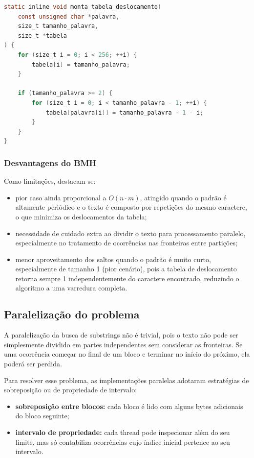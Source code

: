 \documentclass[10pt,twocolumn,a4paper]{article}
\begin{document}
\begin{lstlisting}[language=C, caption={Construção da tabela de deslocamentos do BMH em C}]
static inline void monta_tabela_deslocamento(
    const unsigned char *palavra,
    size_t tamanho_palavra,
    size_t *tabela
) {
    for (size_t i = 0; i < 256; ++i) {
        tabela[i] = tamanho_palavra;
    }

    if (tamanho_palavra >= 2) {
        for (size_t i = 0; i < tamanho_palavra - 1; ++i) {
            tabela[palavra[i]] = tamanho_palavra - 1 - i;
        }
    }
}
\end{lstlisting}

\subsubsection{Desvantagens do BMH}

Como limitações, destacam-se:

\begin{itemize}[leftmargin=*]
    \item pior caso ainda proporcional a $O(n \cdot m)$, atingido quando o padrão é altamente periódico e o texto é composto por repetições do mesmo caractere, o que minimiza os deslocamentos da tabela;
    \item necessidade de cuidado extra ao dividir o texto para processamento paralelo, especialmente no tratamento de ocorrências nas fronteiras entre partições;
    \item menor aproveitamento dos saltos quando o padrão é muito curto, especialmente de tamanho 1 (pior cenário), pois a tabela de deslocamento retorna sempre 1 independentemente do caractere encontrado, reduzindo o algoritmo a uma varredura completa.
\end{itemize}


\subsection{Paralelização do problema}

A paralelização da busca de substrings não é trivial, pois o texto não pode ser simplesmente dividido em partes independentes sem considerar as fronteiras. Se uma ocorrência começar no final de um bloco e terminar no início do próximo, ela poderá ser perdida.

Para resolver esse problema, as implementações paralelas adotaram estratégias de sobreposição ou de propriedade de intervalo:

\begin{itemize}[leftmargin=*]
    \item \textbf{sobreposição entre blocos:} cada bloco é lido com alguns bytes adicionais do bloco seguinte;
    \item \textbf{intervalo de propriedade:} cada thread pode inspecionar além do seu limite, mas só contabiliza ocorrências cujo índice inicial pertence ao seu intervalo.
\end{itemize}
\end{document}
